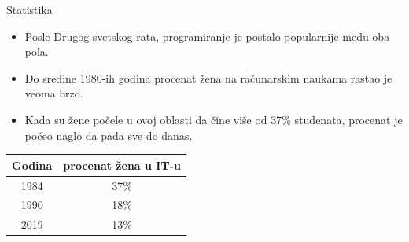 \documentclass[aspectratio=169]{beamer}
\begin{document}
\begin{frame}{Statistika}

    \begin{itemize}
        \item<2-> Posle Drugog svetskog rata, programiranje je postalo popularnije među oba pola.
        
        \item<3->Do sredine 1980-ih godina procenat žena na računarskim naukama rastao je veoma brzo.
        
        \item<4-> Kada su žene počele u ovoj oblasti da čine više od \alert{37\%} studenata, procenat je počeo naglo da pada sve do danas. 
    \end{itemize}

    \begin{table}[h]
        \centering
        \begin{tabular}{c|c}
        \toprule
                Godina    & procenat žena u IT-u \\ 
        \midrule
                1984       & 37\%  \\ 
                1990       & 18\%  \\ 
                2019       & 13\%  \\ 
        \bottomrule
        \end{tabular}
    \end{table}

\end{frame}

\end{document}
